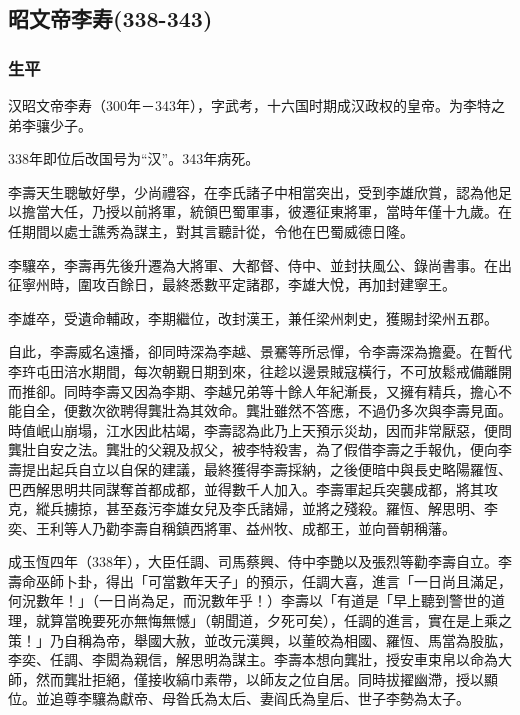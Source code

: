 
\subsection{昭文帝李寿\tiny(338-343)}

\subsubsection{生平}

汉昭文帝李寿（300年－343年），字武考，十六国时期成汉政权的皇帝。为李特之弟李骧少子。

338年即位后改国号为“汉”。343年病死。

李壽天生聰敏好學，少尚禮容，在李氏諸子中相當突出，受到李雄欣賞，認為他足以擔當大任，乃授以前將軍，統領巴蜀軍事，彼遷征東將軍，當時年僅十九歲。在任期間以處士譙秀為謀主，對其言聽計從，令他在巴蜀威德日隆。

李驤卒，李壽再先後升遷為大將軍、大都督、侍中、並封扶風公、錄尚書事。在出征寧州時，圍攻百餘日，最終悉數平定諸郡，李雄大悅，再加封建寧王。

李雄卒，受遺命輔政，李期繼位，改封漢王，兼任梁州刺史，獲賜封梁州五郡。

自此，李壽威名遠播，卻同時深為李越、景騫等所忌憚，令李壽深為擔憂。在暫代李玝屯田涪水期間，每次朝覲日期到來，往趁以邊景賊寇橫行，不可放鬆戒備離開而推卻。同時李壽又因為李期、李越兄弟等十餘人年紀漸長，又擁有精兵，擔心不能自全，便數次欲聘得龔壯為其效命。龔壯雖然不答應，不過仍多次與李壽見面。時值岷山崩塌，江水因此枯竭，李壽認為此乃上天預示災劫，因而非常厭惡，便問龔壯自安之法。龔壯的父親及叔父，被李特殺害，為了假借李壽之手報仇，便向李壽提出起兵自立以自保的建議，最終獲得李壽採納，之後便暗中與長史略陽羅恆、巴西解思明共同謀奪首都成都，並得數千人加入。李壽軍起兵突襲成都，將其攻克，縱兵擄掠，甚至姦污李雄女兒及李氏諸婦，並將之殘殺。羅恆、解思明、李奕、王利等人乃勸李壽自稱鎮西將軍、益州牧、成都王，並向晉朝稱藩。

成玉恆四年（338年），大臣任調、司馬蔡興、侍中李艷以及張烈等勸李壽自立。李壽命巫師卜卦，得出「可當數年天子」的預示，任調大喜，進言「一日尚且滿足，何況數年！」（一日尚為足，而況數年乎！）李壽以「有道是「早上聽到警世的道理，就算當晚要死亦無悔無憾」（朝聞道，夕死可矣），任調的進言，實在是上乘之策！」乃自稱為帝，舉國大赦，並改元漢興，以董皎為相國、羅恆、馬當為股肱，李奕、任調、李閎為親信，解思明為謀主。李壽本想向龔壯，授安車束帛以命為大師，然而龔壯拒絕，僅接收縞巾素帶，以師友之位自居。同時拔擢幽滯，授以顯位。並追尊李驤為獻帝、母昝氏為太后、妻阎氏為皇后、世子李勢為太子。

